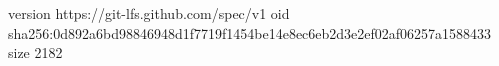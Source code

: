version https://git-lfs.github.com/spec/v1
oid sha256:0d892a6bd98846948d1f7719f1454be14e8ec6eb2d3e2ef02af06257a1588433
size 2182
